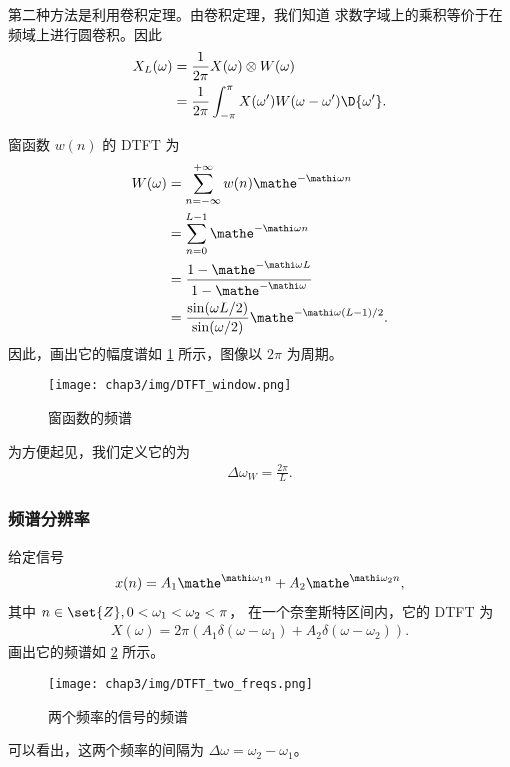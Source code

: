 \begin{example}
    第二种方法是利用卷积定理。由卷积定理，我们知道
    求数字域上的乘积等价于在频域上进行圆卷积。因此
    \begin{align*}
        X_L(\omega) & = \frac{1}{2\pi}X(\omega) \otimes W(\omega) \\
        & = \frac{1}{2\pi}\int_{-\pi}^{\pi}X(\omega')W(\omega - \omega')\D{\omega'}.
    \end{align*}
\end{example}

\begin{example}[窗函数的频谱与主瓣宽度]
    窗函数 $w(n)$ 的 DTFT 为
    \begin{align*}
        W(\omega) & = \sum_{n = -\infty}^{+\infty}w(n) \mathe^{-\mathi\omega n} \\
        & = \sum_{n = 0}^{L-1}\mathe^{-\mathi\omega n} \\
        & = \frac{1 - \mathe^{-\mathi\omega L}}{1 - \mathe^{-\mathi\omega}} \\
        & = \frac{\sin(\omega L/2)}{\sin(\omega/2)}\mathe^{-\mathi\omega(L-1)/2}.
    \end{align*}
    因此，画出它的幅度谱如 \ref{fig:DTFT_window.png} 所示，图像以 $2\pi$ 为周期。
    \begin{figure}[H]
        \centering
        \texttt{[image: chap3/img/DTFT\_window.png]}
        \caption{窗函数的频谱}
        \label{fig:DTFT_window.png}
    \end{figure}
    为方便起见，我们定义它的为
    \begin{align*}
        \Delta\omega_W = \frac{2\pi}{L}.
    \end{align*}
\end{example}

\subsubsection{频谱分辨率}

\begin{example}
    给定信号
    \begin{align*}
        x(n) = A_1\mathe^{\mathi\omega_1 n} + A_2\mathe^{\mathi\omega_2 n},
    \end{align*}
    其中 $n \in \set{Z}, 0 < \omega_1 < \omega_2 < \pi$，
    在一个奈奎斯特区间内，它的 DTFT 为
    \begin{align*}
        X(\omega) = 2\pi(A_1\delta(\omega - \omega_1) + A_2\delta(\omega - \omega_2)).
    \end{align*}
    画出它的频谱如 \ref{fig:DTFT_two_freqs.png} 所示。
    \begin{figure}[H]
        \centering
        \texttt{[image: chap3/img/DTFT\_two\_freqs.png]}
        \caption{两个频率的信号的频谱}
        \label{fig:DTFT_two_freqs.png}
    \end{figure}
    可以看出，这两个频率的间隔为 $\Delta\omega = \omega_2 - \omega_1$。
\end{example}

